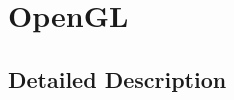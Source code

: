 \hypertarget{group__opengl}{\section{Open\-G\-L}
\label{group__opengl}
}


\subsection{Detailed Description}
